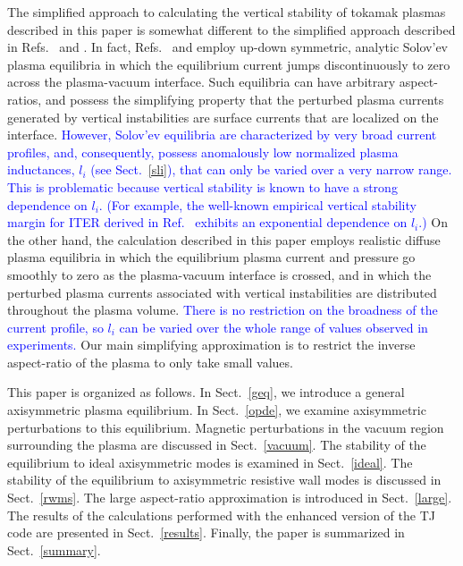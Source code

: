 \documentclass[12pt,prb,aps]{revtex4-1}
\begin{document}
The simplified approach to calculating the vertical stability of tokamak plasmas described in this paper is somewhat different to the simplified approach  described in Refs.~ and .
In fact, Refs.~ and  employ  up-down symmetric, analytic Solov'ev plasma equilibria in which the equilibrium  current jumps discontinuously to zero across the
plasma-vacuum interface. Such equilibria can have arbitrary aspect-ratios, and possess the simplifying property that the perturbed plasma currents generated by vertical instabilities are surface currents that
are localized on the interface. \textcolor{blue}{However, Solov'ev equilibria are characterized by very broad current profiles, and,  consequently, possess anomalously low normalized plasma inductances, $l_i$ (see Sect.~\ref{sli}), that can only be varied over a very narrow range. This is problematic because vertical stability is known to
have a strong dependence on $l_i$. (For example, the well-known empirical vertical stability margin for ITER derived in Ref.~ exhibits an
exponential dependence on $l_i$.)}
On the other hand, the calculation described in this  paper employs realistic diffuse plasma equilibria in which the equilibrium plasma current  and pressure go smoothly to zero as the plasma-vacuum interface is crossed,
and in which the perturbed plasma currents associated with vertical instabilities are distributed throughout the plasma volume. \textcolor{blue}{There is no
restriction on the broadness of the current profile, so $l_i$ can be varied over the whole range of values observed in experiments. }
Our main simplifying approximation is to
restrict the inverse aspect-ratio  of the plasma to only take small values. 

This paper is organized as follows. In Sect.~\ref{geq}, we introduce a general axisymmetric plasma equilibrium. 
In Sect.~\ref{opde}, we examine axisymmetric perturbations to this equilibrium. Magnetic perturbations in the vacuum region
surrounding the plasma are discussed in Sect.~\ref{vacuum}. The stability of the equilibrium to ideal axisymmetric modes is
examined in Sect.~\ref{ideal}. The stability of the equilibrium to axisymmetric resistive wall modes is discussed in Sect.~\ref{rwms}. 
The large aspect-ratio approximation is introduced in Sect.~\ref{large}. The results of the calculations performed with the enhanced version of
the TJ code are presented in Sect.~\ref{results}. Finally, the paper is summarized in Sect.~\ref{summary}. 
\end{document}
